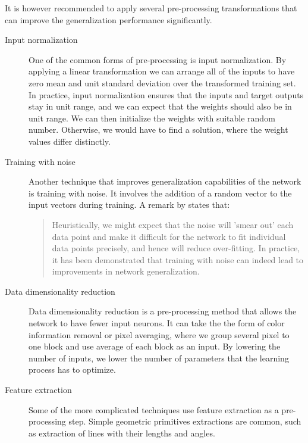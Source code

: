 It is however recommended to apply several pre-processing transformations that can improve the generalization performance significantly.
\begin{description}
\item [Input normalization]
One of the common forms of pre-processing is input normalization. By applying a linear transformation we can arrange all of the inputs to have zero mean and unit standard deviation over the transformed training set.
In practice, input normalization ensures that the inputs and target outputs stay in unit range, and we can expect that the weights should also be in unit range. We can then initialize the weights with suitable random number. Otherwise, we would have to find a solution, where the weight values differ distinctly.
\item [Training with noise]
Another technique that improves generalization capabilities of the network is training with noise. It involves the addition of a random vector to the input vectors during training. A remark by \citet{bishop} states that:
\begin{quotation} Heuristically, we might expect that the noise will 'smear out' each data point
and make it difficult for the network to fit individual data points precisely, and
hence will reduce over-fitting. In practice, it has been demonstrated that training
with noise can indeed lead to improvements in network generalization.
\end{quotation}
\item [Data dimensionality reduction]
Data dimensionality reduction is a pre-processing method that allows the network to have fewer input neurons. It can take the the form of color information removal or pixel averaging, where we group several pixel to one block and use average of each block as an input. By lowering the number of inputs, we lower the number of parameters that the learning process has to optimize.
\item [Feature extraction]
Some of the more complicated techniques use feature extraction as a pre-processing step. Simple geometric primitives extractions are common, such as extraction of lines with their lengths and angles.
\end{description}
